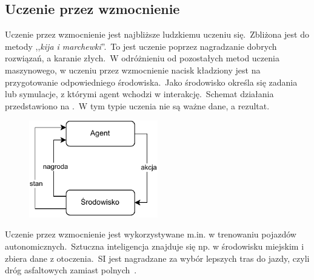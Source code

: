 \subsection{Uczenie przez wzmocnienie}
Uczenie przez wzmocnienie jest najbliższe ludzkiemu uczeniu się.\ Zbliżona jest do metody ,,\textit{kija i marchewki}''.\ To jest uczenie poprzez nagradzanie dobrych rozwiązań, a karanie złych.\ W odróżnieniu od pozostałych metod uczenia maszynowego, w uczeniu przez wzmocnienie nacisk kładziony jest na przygotowanie odpowiedniego środowiska.\ Jako środowisko określa się zadania lub symulacje, z którymi agent wchodzi w interakcję.\ Schemat działania przedstawiono na .\ W tym typie uczenia nie są ważne dane, a rezultat.

\begin{figure}[H]
    \centering
    \includegraphics[width=0.5\textwidth]{images/reinforcemen}
    \label{fig:reinforcemenet}
\end{figure}

Uczenie przez wzmocnienie jest wykorzystywane m.in. w trenowaniu pojazdów autonomicznych.\ Sztuczna inteligencja znajduje się np. w środowisku miejskim i zbiera dane z otoczenia.\ SI jest nagradzane za wybór lepszych tras do jazdy, czyli dróg asfaltowych zamiast polnych~\cite{AiScience, Mahesh2018}.


